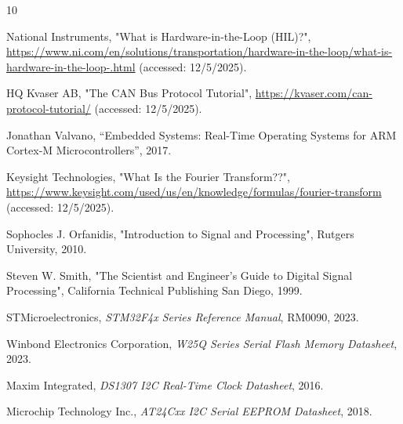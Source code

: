 \sloppy

\begin{thebibliography}{10}

National Instruments, "What is Hardware-in-the-Loop (HIL)?",
\url{https://www.ni.com/en/solutions/transportation/hardware-in-the-loop/what-is-hardware-in-the-loop-.html}
(accessed: 12/5/2025).

HQ Kvaser AB, "The CAN Bus Protocol Tutorial",
\url{https://kvaser.com/can-protocol-tutorial/}
(accessed: 12/5/2025).

Jonathan Valvano, “Embedded Systems: Real-Time Operating Systems for ARM Cortex-M Microcontrollers”, 2017.

Keysight Technologies, "What Is the Fourier Transform??", 
\url{https://www.keysight.com/used/us/en/knowledge/formulas/fourier-transform}
(accessed: 12/5/2025).

Sophocles J. Orfanidis, "Introduction to Signal and Processing", Rutgers University, 2010.

Steven W. Smith, "The Scientist and Engineer's Guide to Digital Signal Processing", California Technical Publishing San Diego, 1999.

STMicroelectronics, \textit{STM32F4x Series Reference Manual}, RM0090, 2023.

Winbond Electronics Corporation, 
\textit{W25Q Series Serial Flash Memory Datasheet}, 2023.

Maxim Integrated, 
\textit{DS1307 I2C Real-Time Clock Datasheet}, 2016.

Microchip Technology Inc., 
\textit{AT24Cxx I2C Serial EEPROM Datasheet}, 2018.

\end{thebibliography}
